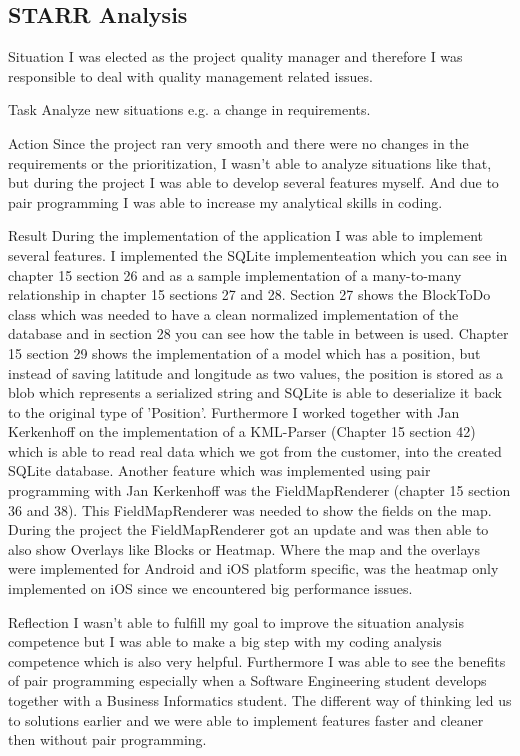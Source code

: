 \documentclass[12pt]{article}
\begin{document}
	\subsection{STARR Analysis}
	\begin{STARR}
	    \item[Situation] I was elected as the project quality manager and therefore I was responsible to deal with quality management related issues.
	    \item[Task] Analyze new situations e.g. a change in requirements.
	    \item[Action] Since the project ran very smooth and there were no changes in the requirements or the prioritization, I wasn't able to analyze situations like that, but during the project I was able to develop several features myself. And due to pair programming I was able to increase my analytical skills in coding.
	    \item[Result] During the implementation of the application I was able to implement several features. I implemented the SQLite implementeation which you can see in chapter 15 section 26 and as a sample implementation of a many-to-many relationship in chapter 15 sections 27 and 28. Section 27 shows the BlockToDo class which was needed to have a clean normalized implementation of the database and in section 28 you can see how the table in between is used. Chapter 15 section 29 shows the implementation of a model which has a position, but instead of saving latitude and longitude as two values, the position is stored as a blob which represents a serialized string and SQLite is able to deserialize it back to the original type of 'Position'. Furthermore I worked together with Jan Kerkenhoff on the implementation of a KML-Parser (Chapter 15 section 42) which is able to read real data which we got from the customer, into the created SQLite database. Another feature which was implemented using pair programming with Jan Kerkenhoff was the FieldMapRenderer (chapter 15 section 36 and 38). This FieldMapRenderer was needed to show the fields on the map. During the project the FieldMapRenderer got an update and was then able to also show Overlays like Blocks or Heatmap. Where the map and the overlays were implemented for Android and iOS platform specific, was the heatmap only implemented on iOS since we encountered big performance issues.
	    \item[Reflection] I wasn't able to fulfill my goal to improve the situation analysis competence but I was able to make a big step with my coding analysis competence which is also very helpful. Furthermore I was able to see the benefits of pair programming especially when a Software Engineering student develops together with a Business Informatics student. The different way of thinking led us to solutions earlier and we were able to implement features faster and cleaner then without pair programming.
	\end{STARR}
	
	
	
	
	
	
	
\end{document}
